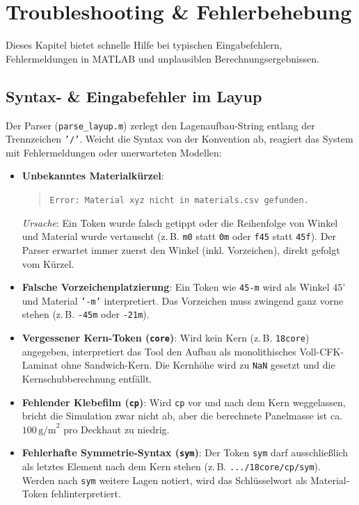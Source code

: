 \chapter{Troubleshooting \& Fehlerbehebung} \label{ch:troubleshooting}

Dieses Kapitel bietet schnelle Hilfe bei typischen Eingabefehlern, Fehlermeldungen in MATLAB und unplausiblen Berechnungsergebnissen.

\section{Syntax- \& Eingabefehler im Layup} \label{sec:ts_syntax}

Der Parser (\texttt{parse\_layup.m}) zerlegt den Lagenaufbau-String entlang der Trennzeichen \texttt{'/'}. Weicht die Syntax von der Konvention ab, reagiert das System mit Fehlermeldungen oder unerwarteten Modellen:

\begin{itemize}
    \item \textbf{Unbekanntes Materialkürzel}:
    \begin{quote}
        \texttt{Error: Material xyz nicht in materials.csv gefunden.}
    \end{quote}
    \textit{Ursache}: Ein Token wurde falsch getippt oder die Reihenfolge von Winkel und Material wurde vertauscht (z.\,B. \texttt{m0} statt \texttt{0m} oder \texttt{f45} statt \texttt{45f}). Der Parser erwartet immer zuerst den Winkel (inkl. Vorzeichen), direkt gefolgt vom Kürzel.
    
    \item \textbf{Falsche Vorzeichenplatzierung}:
    Ein Token wie \texttt{45-m} wird als Winkel $45^\circ$ und Material \texttt{'-m'} interpretiert. Das Vorzeichen muss zwingend ganz vorne stehen (z.\,B. \texttt{-45m} oder \texttt{-21m}).

    \item \textbf{Vergessener Kern-Token (\texttt{core})}:
    Wird kein Kern (z.\,B. \texttt{18core}) angegeben, interpretiert das Tool den Aufbau als monolithisches Voll-CFK-Laminat ohne Sandwich-Kern. Die Kernhöhe wird zu \texttt{NaN} gesetzt und die Kernschubberechnung entfällt.

    \item \textbf{Fehlender Klebefilm (\texttt{cp})}:
    Wird \texttt{cp} vor und nach dem Kern weggelassen, bricht die Simulation zwar nicht ab, aber die berechnete Panelmasse ist ca. $100\,\text{g/m}^2$ pro Deckhaut zu niedrig.

    \item \textbf{Fehlerhafte Symmetrie-Syntax (\texttt{sym})}:
    Der Token \texttt{sym} darf ausschließlich als letztes Element nach dem Kern stehen (z.\,B. \texttt{.../18core/cp/sym}). Werden nach \texttt{sym} weitere Lagen notiert, wird das Schlüsselwort als Material-Token fehlinterpretiert.
\end{itemize}

